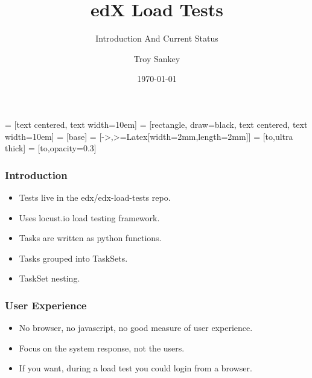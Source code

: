 \documentclass{beamer}
\title{edX Load Tests}
\subtitle{Introduction And Current Status}
\author{Troy Sankey}
\date{\today}
\begin{document}
 = [text centered, text width=10em]
 = [rectangle, draw=black, text centered, text width=10em]
 = [base]
 = [->,>={Latex[width=2mm,length=2mm]}]
 = [to,ultra thick]
 = [to,opacity=0.3]

\begin{frame}
\titlepage
\end{frame}

\begin{frame}
\frametitle{Introduction}
\begin{itemize}
\item Tests live in the edx/edx-load-tests repo.\pause
\item Uses locust.io load testing framework.\pause
\item Tasks are written as python functions.\pause
\item Tasks grouped into TaskSets.\pause
\item TaskSet nesting.
\end{itemize}
\end{frame}


\begin{frame}
\frametitle{User Experience}
\begin{itemize}
\item No browser, no javascript, no good measure of user experience.\pause
\item Focus on the system response, not the users.\pause
\item If you want, during a load test you could login from a browser.
\end{itemize}
\end{frame}
\end{document}
